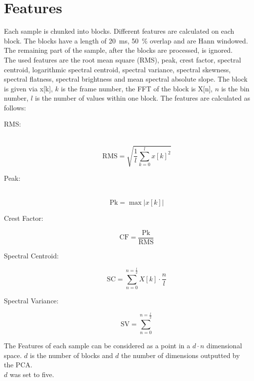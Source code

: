 \section{Features}
\label{sec:Features}
Each sample is chunked into blocks. Different features are calculated on each block. The blocks have a length of 20~ms, 50~\% overlap and are Hann windowed. The remaining part of the sample, after the blocks are processed, is ignored.\\
The used features are the root mean square (RMS), peak, crest factor, spectral centroid, logarithmic spectral centroid, spectral variance, spectral skewness, spectral flatness, spectral brightness and mean spectral absolute slope. The block is given via x[k], $k$ is the frame number, the FFT of the block is X[n], $n$ is the bin number, $l$ is the number of values within one block. The features are calculated as follows:
\begin{description}
    \item[RMS:]\\
        \[
            \mathrm{RMS} = \sqrt{\frac{1}{l}\sum_{k=0}^{l}{x[k]^2}}
        \]
    \item[Peak:]\\
        \[
            \mathrm{Pk} = \max{|x[k]|}
        \]
    \item[Crest Factor:]
        \[
            \mathrm{CF} = \frac{\mathrm{Pk}}{\mathrm{RMS}}
        \]
    \item[Spectral Centroid:]
        \[
            \mathrm{SC} = \sum_{n=0}^{n=\frac{l}{2}}{X[k]\cdot \frac{n}{l}}
        \]
    \item[Spectral Variance:]
        \[
            \mathrm{SV} = \sum_{n=0}^{n=\frac{l}{2}}{}
        \]
\end{description}


The Features of each sample can be considered as a point in a $d \cdot n$ dimensional space. $d$ is the number of blocks and $d$ the number of dimensions outputted by the PCA.\\
$d$ was set to five.